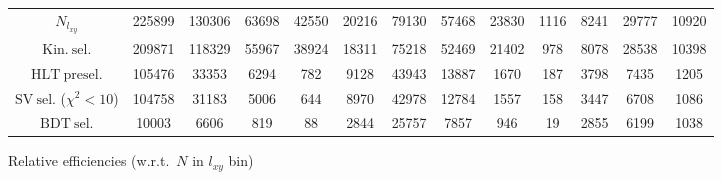 \documentclass[10pt,a4paper]{article}
\begin{document}
\begin{landscape}
{\begin{tabular}{c|cccc|cccc|cccc}
\midrule
$N_{l_{xy}}$ & 225899 & 130306 & 63698 & 42550 & 20216 & 79130 & 57468 & 23830 & 1116 & 8241 & 29777 & 10920\\
$\mathrm{Kin.\ sel.}$ & 209871 & 118329 & 55967 & 38924 & 18311 & 75218 & 52469 & 21402 & 978 & 8078 & 28538 & 10398\\
$\mathrm{HLT\ presel.}$ & 105476 & 33353 & 6294 & 782 & 9128 & 43943 & 13887 & 1670 & 187 & 3798 & 7435 & 1205\\
$\mathrm{SV\ sel.}$ ($\chi^2{<}10$) & 104758 & 31183 & 5006 & 644 & 8970 & 42978 & 12784 & 1557 & 158 & 3447 & 6708 & 1086\\
$\mathrm{BDT\ sel.}$ & 10003 & 6606 & 819 & 88 & 2844 & 25757 & 7857 & 946 & 19 & 2855 & 6199 & 1038\\
\bottomrule
\end{tabular}}

\vspace{18pt}

Relative efficiencies (w.r.t.\ $N$ in $l_{xy}$ bin)


\end{landscape}
\end{document}
